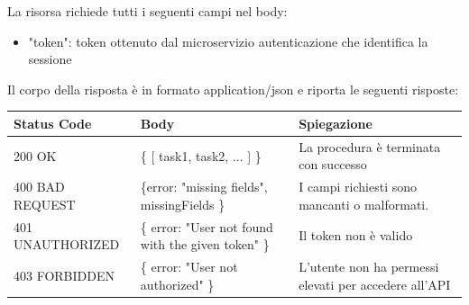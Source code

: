 \documentclass{report}
\begin{document}
La risorsa richiede tutti i seguenti campi nel body:
\begin{itemize}
	\item "token": token ottenuto dal microservizio autenticazione che identifica la sessione
\end{itemize}

Il corpo della risposta è in formato application/json e riporta le seguenti risposte:

\begin{center} %
	\centering
	\begin{tabular}{ |p{4cm}|p{4cm}|p{4cm}| }
		\hline
		\centering Status Code & \qquad\qquad\quad Body & \qquad\quad Spiegazione\\ %
		\hline
		200 OK & \{ [ task1, task2, ... ] \}  & La procedura è terminata con successo	\\ 
		\hline
		400 BAD REQUEST & \{error: "missing fields", missingFields \} & I campi richiesti sono mancanti o malformati. \\
		\hline
		401 UNAUTHORIZED & \{ error: "User not found with the given token" \} & Il token non è valido \\
		\hline
		403 FORBIDDEN & \{ error: "User not authorized" \} &  L'utente non ha permessi elevati per accedere all'API \\
		\hline
	\end{tabular}
\end{center}
\end{document}
